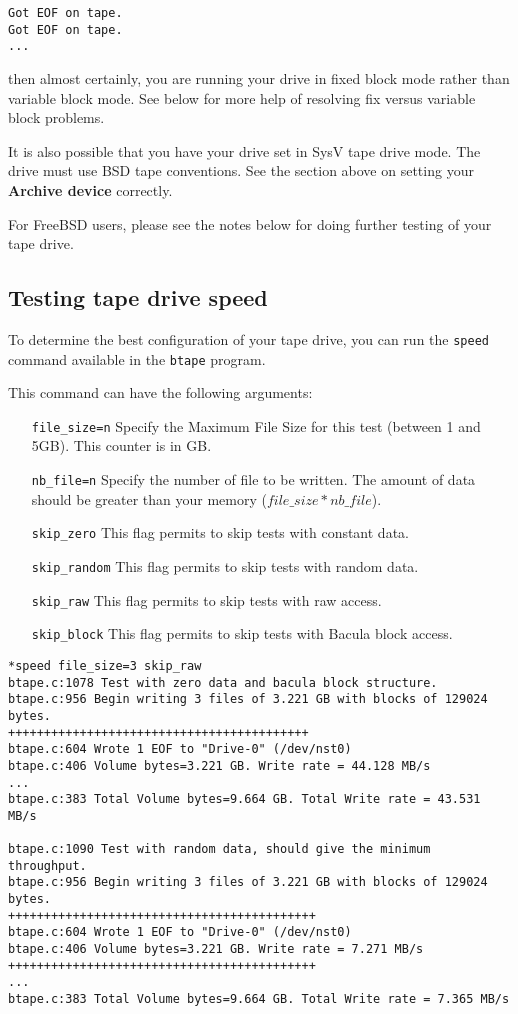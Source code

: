 \footnotesize
\begin{verbatim}
Got EOF on tape.
Got EOF on tape.
...
\end{verbatim}
\normalsize

then almost certainly, you are running your drive in fixed block mode rather
than variable block mode. See below for more help of resolving fix
versus variable block problems.

It is also possible that you have your drive
set in SysV tape drive mode. The drive must use BSD tape conventions.
See the section above on setting your {\bf Archive device} correctly.

For FreeBSD users, please see the notes below for doing further testing of
your tape drive. 

\subsection{Testing tape drive speed}
\label{sec:btapespeed}

To determine the best configuration of your tape drive, you can run the
\texttt{speed} command available in the \texttt{btape} program.

This command can have the following arguments:
\begin{itemize}
\item[\texttt{file\_size=n}] Specify the Maximum File Size for this test
  (between 1 and 5GB). This counter is in GB.
\item[\texttt{nb\_file=n}] Specify the number of file to be written. The amount
  of data should be greater than your memory ($file\_size*nb\_file$).
\item[\texttt{skip\_zero}] This flag permits to skip tests with constant
  data.
\item[\texttt{skip\_random}] This flag permits to skip tests with random
  data.
\item[\texttt{skip\_raw}] This flag permits to skip tests with raw access.
\item[\texttt{skip\_block}] This flag permits to skip tests with Bacula block
  access.
\end{itemize}

\begin{verbatim}
*speed file_size=3 skip_raw
btape.c:1078 Test with zero data and bacula block structure.
btape.c:956 Begin writing 3 files of 3.221 GB with blocks of 129024 bytes.
++++++++++++++++++++++++++++++++++++++++++
btape.c:604 Wrote 1 EOF to "Drive-0" (/dev/nst0)
btape.c:406 Volume bytes=3.221 GB. Write rate = 44.128 MB/s
...
btape.c:383 Total Volume bytes=9.664 GB. Total Write rate = 43.531 MB/s

btape.c:1090 Test with random data, should give the minimum throughput.
btape.c:956 Begin writing 3 files of 3.221 GB with blocks of 129024 bytes.
+++++++++++++++++++++++++++++++++++++++++++
btape.c:604 Wrote 1 EOF to "Drive-0" (/dev/nst0)
btape.c:406 Volume bytes=3.221 GB. Write rate = 7.271 MB/s
+++++++++++++++++++++++++++++++++++++++++++
...
btape.c:383 Total Volume bytes=9.664 GB. Total Write rate = 7.365 MB/s

\end{verbatim}

